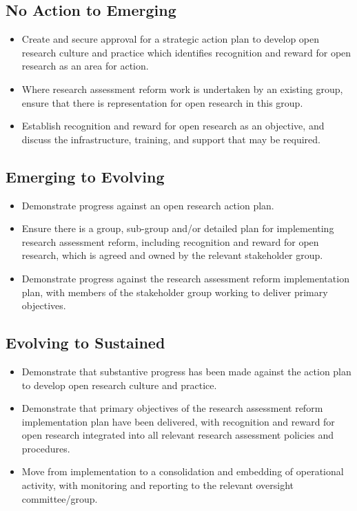 \documentclass[
  letterpaper,
  DIV=11,
  numbers=noendperiod,
  oneside]{scrreprt}
\begin{document}
\subsection{No Action to Emerging}\label{no-action-to-emerging-2}

\begin{itemize}
\item
  Create and secure approval for a strategic action plan to develop open
  research culture and practice which identifies recognition and reward
  for open research as an area for action.
\item
  Where research assessment reform work is undertaken by an existing
  group, ensure that there is representation for open research in this
  group.
\item
  Establish recognition and reward for open research as an objective,
  and discuss the infrastructure, training, and support that may be
  required.
\end{itemize}

\subsection{Emerging to Evolving}\label{emerging-to-evolving-2}

\begin{itemize}
\item
  Demonstrate progress against an open research action plan.
\item
  Ensure there is a group, sub-group and/or detailed plan for
  implementing research assessment reform, including recognition and
  reward for open research, which is agreed and owned by the relevant
  stakeholder group.
\item
  Demonstrate progress against the research assessment reform
  implementation plan, with members of the stakeholder group working to
  deliver primary objectives.
\end{itemize}

\subsection{Evolving to Sustained}\label{evolving-to-sustained-2}

\begin{itemize}
\item
  Demonstrate that substantive progress has been made against the action
  plan to develop open research culture and practice.
\item
  Demonstrate that primary objectives of the research assessment reform
  implementation plan have been delivered, with recognition and reward
  for open research integrated into all relevant research assessment
  policies and procedures.
\item
  Move from implementation to a consolidation and embedding of
  operational activity, with monitoring and reporting to the relevant
  oversight committee/group.
\end{itemize}
\end{document}
